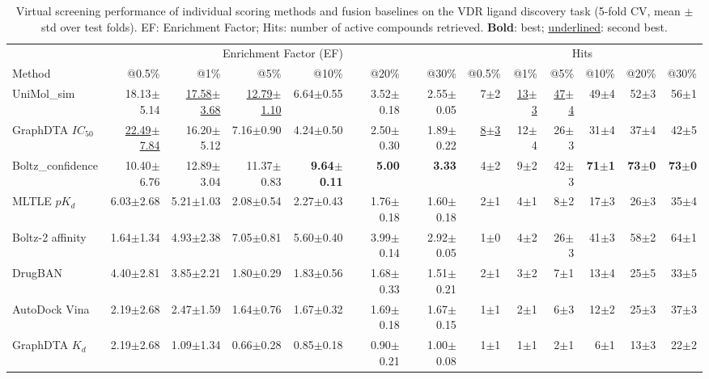 \begin{table}[htbp!]
\centering
\caption{Virtual screening performance of individual scoring methods and fusion baselines on the VDR ligand discovery task (5-fold CV, mean $\pm$ std over test folds). EF: Enrichment Factor; Hits: number of active compounds retrieved. \textbf{Bold}: best; \underline{underlined}: second best.}
\label{tab:fusion_performance}
\small
\begin{tabular}{lrrrrrr|rrrrrr}
\toprule
& \multicolumn{6}{c|}{Enrichment Factor (EF)} & \multicolumn{6}{c}{Hits} \\
Method & @0.5\% & @1\% & @5\% & @10\% & @20\% & @30\% & @0.5\% & @1\% & @5\% & @10\% & @20\% & @30\% \\
\midrule
UniMol_sim & 18.13$\pm$5.14 & \underline{17.58$\pm$3.68} & \underline{12.79$\pm$1.10} & 6.64$\pm$0.55 & 3.52$\pm$0.18 & 2.55$\pm$0.05 & 7$\pm$2 & \underline{13$\pm$3} & \underline{47$\pm$4} & 49$\pm$4 & 52$\pm$3 & 56$\pm$1 \\
GraphDTA $IC_{50}$ & \underline{22.49$\pm$7.84} & 16.20$\pm$5.12 & 7.16$\pm$0.90 & 4.24$\pm$0.50 & 2.50$\pm$0.30 & 1.89$\pm$0.22 & \underline{8$\pm$3} & 12$\pm$4 & 26$\pm$3 & 31$\pm$4 & 37$\pm$4 & 42$\pm$5 \\
Boltz_confidence & 10.40$\pm$6.76 & 12.89$\pm$3.04 & 11.37$\pm$0.83 & \textbf{9.64$\pm$0.11} & \textbf{5.00} & \textbf{3.33} & 4$\pm$2 & 9$\pm$2 & 42$\pm$3 & \textbf{71$\pm$1} & \textbf{73$\pm$0} & \textbf{73$\pm$0} \\
MLTLE $pK_d$ & 6.03$\pm$2.68 & 5.21$\pm$1.03 & 2.08$\pm$0.54 & 2.27$\pm$0.43 & 1.76$\pm$0.18 & 1.60$\pm$0.18 & 2$\pm$1 & 4$\pm$1 & 8$\pm$2 & 17$\pm$3 & 26$\pm$3 & 35$\pm$4 \\
Boltz-2 affinity & 1.64$\pm$1.34 & 4.93$\pm$2.38 & 7.05$\pm$0.81 & 5.60$\pm$0.40 & 3.99$\pm$0.14 & 2.92$\pm$0.05 & 1$\pm$0 & 4$\pm$2 & 26$\pm$3 & 41$\pm$3 & 58$\pm$2 & 64$\pm$1 \\
DrugBAN & 4.40$\pm$2.81 & 3.85$\pm$2.21 & 1.80$\pm$0.29 & 1.83$\pm$0.56 & 1.68$\pm$0.33 & 1.51$\pm$0.21 & 2$\pm$1 & 3$\pm$2 & 7$\pm$1 & 13$\pm$4 & 25$\pm$5 & 33$\pm$5 \\
AutoDock Vina & 2.19$\pm$2.68 & 2.47$\pm$1.59 & 1.64$\pm$0.76 & 1.67$\pm$0.32 & 1.69$\pm$0.18 & 1.67$\pm$0.15 & 1$\pm$1 & 2$\pm$1 & 6$\pm$3 & 12$\pm$2 & 25$\pm$3 & 37$\pm$3 \\
GraphDTA $K_{d}$ & 2.19$\pm$2.68 & 1.09$\pm$1.34 & 0.66$\pm$0.28 & 0.85$\pm$0.18 & 0.90$\pm$0.21 & 1.00$\pm$0.08 & 1$\pm$1 & 1$\pm$1 & 2$\pm$1 & 6$\pm$1 & 13$\pm$3 & 22$\pm$2 \\

\end{tabular}
\end{table}

